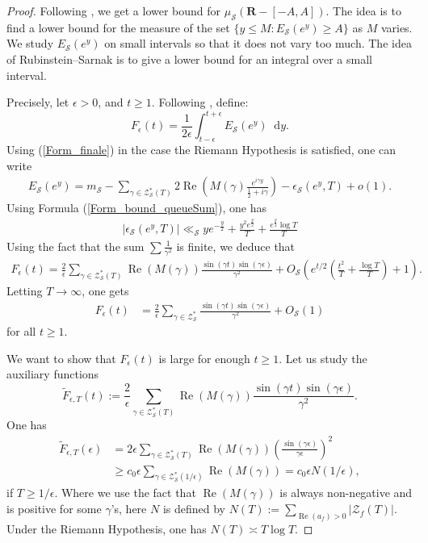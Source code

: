 \documentclass[a4paper,10pt]{amsart}
\theoremstyle{plain}
\theoremstyle{definition}
\begin{document}
\begin{proof}
Following \cite[2.2]{RS}, we get a lower bound for $\mu_{\mathcal{S}}(\mathbf{R}-[-A,A])$.
The idea is to find a lower bound for the measure of the set $\lbrace y\leq M : E_{\mathcal{S}}(e^{y})\geq A\rbrace$ as $M$ varies.
We study $E_{\mathcal{S}}(e^{y})$ on small intervals so that it does not vary too much.
The idea of Rubinstein--Sarnak is to give a lower bound for an integral over a small interval.

Precisely, let $\epsilon>0$, and $t\geq 1$. Following \cite{RS}, define:
$$ F_{\epsilon}(t) = \frac{1}{2\epsilon}\int_{t-\epsilon}^{t+\epsilon} E_{\mathcal{S}}(e^{y}){\mathop{}\!\mathrm{d}} y.$$
Using (\ref{Form_finale}) in the case the Riemann Hypothesis is satisfied, one can write
\begin{align*}
E_{\mathcal{S}}(e^{y}) = m_{\mathcal{S}}
 -\sum_{ \gamma\in\mathcal{Z}_{\mathcal{S}}^{*}(T)}2\operatorname{Re}\left(M(\gamma)\frac{e^{i\gamma y}}{\frac{1}{2} + i\gamma}\right) 
- \epsilon_{\mathcal{S}}(e^{y},T)
 + o(1).
\end{align*}
Using Formula (\ref{Form_bound_queueSum}), one has 
\begin{align*}
\lvert \epsilon_{\mathcal{S}}(e^{y},T)\rvert \ll_{\mathcal{S}} ye^{-\frac{y}{2}} + \frac{y^{2}e^{\frac{y}{2}}}{T} + \frac{e^{\frac{y}{2}}\log T}{T}
\end{align*}
Using the fact that the sum $\sum\frac{1}{\gamma^{2}}$ is finite, we deduce that
\begin{align*}
F_{\epsilon}(t) 
= \frac{2}{\epsilon}\sum_{\gamma\in\mathcal{Z}^{*}_{\mathcal{S}}(T)} \operatorname{Re}(M(\gamma))
\frac{\sin(\gamma t)\sin(\gamma\epsilon)}{\gamma^{2}} 
+  O_{\mathcal{S}}\left(  e^{t/2}\left(\frac{t^{2}}{T}
+ \frac{\log T}{T}\right) + 1  \right). 
\end{align*}
Letting $T\rightarrow\infty$, one gets
\begin{align}\label{Formule_petite_diff}
F_{\epsilon}(t) &=  
\frac{2}{\epsilon}\sum_{\gamma\in\mathcal{Z}^{*}_{\mathcal{S}}} \frac{\sin(\gamma t)\sin(\gamma\epsilon)}{\gamma^{2}} + O_{\mathcal{S}}(1)
\end{align}
for all $t\geq 1$.

We want to show that $F_{\epsilon}(t)$ is large for enough $t\geq1$.
Let us study the auxiliary functions
$$\tilde{F}_{\epsilon,T}(t) :=  
\frac{2}{\epsilon}\sum_{\gamma\in\mathcal{Z}^{*}_{\mathcal{S}}(T)}\operatorname{Re}(M(\gamma))\frac{\sin(\gamma t)\sin(\gamma\epsilon)}{\gamma^{2}}.$$
One has
\begin{align*}
\tilde{F}_{\epsilon,T}(\epsilon)
&= 2\epsilon\sum_{\gamma\in\mathcal{Z}^{*}_{\mathcal{S}}(T)} \operatorname{Re}(M(\gamma))
\left(\frac{\sin(\gamma\epsilon)}{\gamma\epsilon}\right)^{2} \\
&\geq c_{0} \epsilon
\sum_{\gamma\in\mathcal{Z}^{*}_{\mathcal{S}}(1/\epsilon)}\operatorname{Re}(M(\gamma))
= c_{0} \epsilon N(1/\epsilon),
\end{align*}
if $T\geq 1/\epsilon$.
Where we use the fact that $\operatorname{Re}(M(\gamma))$ is always non-negative and is positive for some $\gamma$'s, here $N$ is defined by
$N(T) := \sum_{\operatorname{Re}(a_{f})>0}\lvert \mathcal{Z}_{f}(T)\rvert$.  
Under the Riemann Hypothesis, one has $N(T) \asymp T\log T$.


\end{proof}
\end{document}
